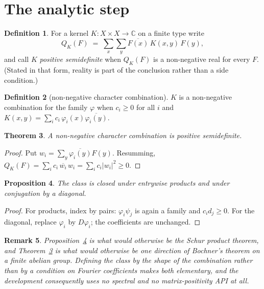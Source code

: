 \documentclass[11pt]{article}
\newtheorem{theorem}{Theorem}[section]
\newtheorem{proposition}[theorem]{Proposition}
\newtheorem{remark}[theorem]{Remark}
\theoremstyle{definition}
\newtheorem{definition}[theorem]{Definition}
\newcommand{\C}{\mathbb{C}}
\begin{document}
\section{The analytic step}

\begin{definition}
For a kernel $K : X \times X \to \C$ on a finite type write
\[
  Q_K(F) \;=\; \sum_{x}\sum_{y} \overline{F(x)}\,K(x,y)\,F(y),
\]
and call $K$ \emph{positive semidefinite} when $Q_K(F)$ is a non-negative real
for every $F$.  (Stated in that form, reality is part of the conclusion rather
than a side condition.)
\end{definition}

\begin{definition}[non-negative character combination]
$K$ is a non-negative combination for the family $\varphi$ when $c_i \ge 0$ for
all $i$ and $K(x,y) = \sum_i c_i\,\varphi_i(x)\overline{\varphi_i(y)}$.
\end{definition}

\begin{theorem}
\label{thm:psd}
A non-negative character combination is positive semidefinite.
\end{theorem}

\begin{proof}
Put $w_i = \sum_y \overline{\varphi_i(y)}F(y)$.  Resumming,
$Q_K(F) = \sum_i c_i\,\overline{w_i}\,w_i = \sum_i c_i |w_i|^2 \ge 0$.
\end{proof}

\begin{proposition}
\label{prop:closure}
The class is closed under entrywise products and under conjugation by a
diagonal.
\end{proposition}

\begin{proof}
For products, index by pairs: $\varphi_i\psi_j$ is again a family and
$c_id_j \ge 0$.  For the diagonal, replace $\varphi_i$ by $D\varphi_i$; the
coefficients are unchanged.
\end{proof}

\begin{remark}
Proposition~\ref{prop:closure} is what would otherwise be the Schur product
theorem, and Theorem~\ref{thm:psd} is what would otherwise be one direction of
Bochner's theorem on a finite abelian group.  Defining the class by the shape
of the combination rather than by a condition on Fourier coefficients makes
both elementary, and the development consequently uses no spectral and no
matrix-positivity API at all.
\end{remark}
\end{document}
